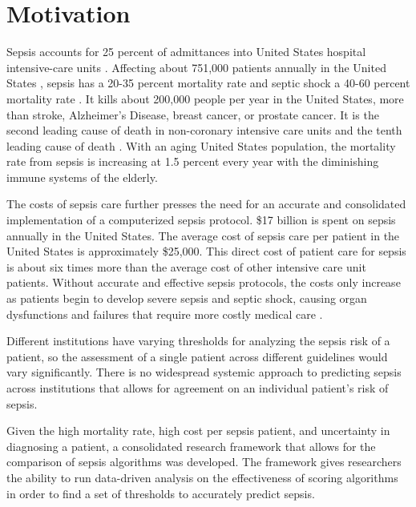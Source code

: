 \documentclass{sig-alternate}
\begin{document}
\vspace{10pt}
\section{Motivation}
\vspace{10pt}
\label{sec:motivation}

Sepsis accounts for 25 percent of admittances into United States hospital intensive-care units \cite{epi}. Affecting about 751,000 patients annually in the United States \cite{sepsis_def}, sepsis has a 20-35 percent mortality rate and septic shock a 40-60 percent mortality rate \cite{meds}. It kills about 200,000 people per year in the United States, more than stroke, Alzheimer's Disease, breast cancer, or prostate cancer. It is the second leading cause of death in non-coronary intensive care units and the tenth leading cause of death \cite{epi}. With an aging United States population, the mortality rate from sepsis is increasing at 1.5 percent every year with the diminishing immune systems of the elderly.

The costs of sepsis care further presses the need for an accurate and consolidated implementation of a computerized sepsis protocol. \$17 billion is spent on sepsis annually in the United States. The average cost of sepsis care per patient in the United States is approximately \$25,000. This direct cost of patient care for sepsis is about six times more than the average cost of other intensive care unit patients. Without accurate and effective sepsis protocols, the costs only increase as patients begin to develop severe sepsis and septic shock, causing organ dysfunctions and failures that require more costly medical care \cite{yearbook}.

Different institutions have varying thresholds for analyzing the sepsis risk of a patient, so the assessment of a single patient across different guidelines would vary significantly. There is no widespread systemic approach to predicting sepsis across institutions that allows for agreement on an individual patient's risk of sepsis. 

Given the high mortality rate, high cost per sepsis patient, and uncertainty in diagnosing a patient, a consolidated research framework that allows for the comparison of sepsis algorithms was developed.  The framework gives researchers the ability to run data-driven analysis on the effectiveness of scoring algorithms in order to find a set of thresholds to accurately predict sepsis.
\end{document}
